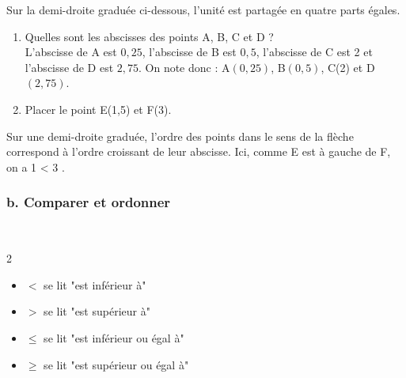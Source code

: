 \begin{Exemple}
Sur la demi-droite graduée ci-dessous, l'unité est partagée en quatre parts égales. 

\begin{center}

\end{center}
\begin{enumerate}
\item Quelles sont les abscisses des points A, B, C et D ?\\
L'abscisse de A est $0,25$, l'abscisse de B est $0,5$, l'abscisse de C est 2 et l'abscisse de D est $2,75$. On note donc : A$ \left( 0,25  \right) $, B$ \left(  0,5  \right)  $, C(2) et D$ \left(  2,75 \right)  $.
\item Placer le point E(1,5) et F(3). 
\end{enumerate}
\end{Exemple}
\vspace{-0.3cm}
\begin{Remarque}
Sur une demi-droite graduée, l'ordre des points dans le sens de la flèche correspond à l'ordre croissant de leur abscisse. Ici, comme E est à gauche de F, on a 1 < 3 .
\end{Remarque}



\subsubsection*{b. Comparer et ordonner}

\begin{Vocabulaire}[c]
$ $
\vspace{-1cm}
\begin{multicols}{2}
\begin{itemize}[label=\textcolor{Couleur7}{$\bullet$}]
\item $<$ se lit "est inférieur à"
\item $>$ se lit "est supérieur à"
\item $\leq$ se lit "est inférieur ou égal à"
\item $\geq$ se lit "est supérieur ou égal à"
\end{itemize}
\end{multicols}
\vspace{-0.5cm}
\end{Vocabulaire}

